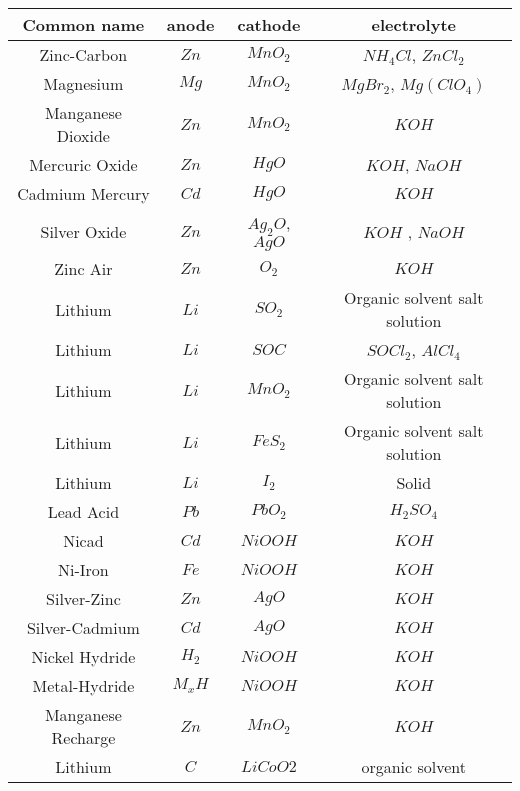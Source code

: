 \documentclass[10pt]{article}
\begin{document}
\noindent
\begin{tabular}{| c c c c |}
	\hline
	Common name & anode & cathode & electrolyte \\
	\hline
	Zinc-Carbon & $Zn$ & $MnO_2$ & $NH_4Cl$, $ZnCl_2$\\
	Magnesium & $Mg$ & $MnO_2$ & $MgBr_2$, $Mg(ClO_4)$ \\
	Manganese Dioxide & $Zn$ & $MnO_2$ & $KOH$ \\
	Mercuric Oxide & $Zn$ & $HgO$ & $KOH$, $NaOH$ \\
	Cadmium Mercury & $Cd$ & $HgO$ & $KOH$ \\
	Silver Oxide & $Zn$ & $Ag_2O$, $AgO$ & $KOH$ , $NaOH$\\
	Zinc Air & $Zn$ & $O_2$ & $KOH$ \\
	Lithium & $Li$ & $SO_2$ & Organic solvent salt solution \\
	Lithium & $Li$ & $SOC$ & $SOCl_2$, $AlCl_4$ \\
	Lithium & $Li$ & $MnO_2$ & Organic solvent salt solution\\
	Lithium & $Li$ & $FeS_2$ & Organic solvent salt solution \\
	Lithium & $Li$ & $I_2$ & Solid \\
	Lead Acid & $Pb$ & $PbO_2$ & $H_2SO_4$ \\
	Nicad & $Cd$ & $NiOOH$ & $KOH$ \\
	Ni-Iron & $Fe$ & $NiOOH$ & $KOH$  \\
	Silver-Zinc & $Zn$ & $AgO$ & $KOH$ \\
	Silver-Cadmium & $Cd$ & $AgO$ & $KOH$ \\
	Nickel Hydride & $H_2$ & $NiOOH$ & $KOH$ \\
	Metal-Hydride & $M_xH$ & $NiOOH$ & $KOH$ \\
	Manganese Recharge & $Zn$ & $MnO_2$ & $KOH$ \\
	Lithium & $C$ & $LiCoO2$ & organic solvent\\
	\hline	
\end{tabular}
\end{document}
